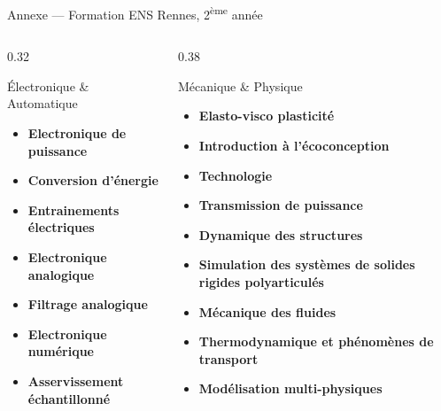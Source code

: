 \documentclass[aspectratio=169]{beamer}
\begin{document}
	\begin{frame}[t,shrink=8]{Annexe — Formation ENS Rennes, 2\textsuperscript{ème} année }
		\begin{columns}[T]
			\begin{column}{0.32\textwidth}
				\begin{block}{Électronique \& Automatique}
					\tiny\begin{itemize}\setlength\itemsep{1pt}\setlength\parsep{0pt}
						\item \textbf{Electronique de puissance}
						\item \textbf{Conversion d'énergie}
						\item \textbf{Entrainements électriques}
						\item \textbf{Electronique analogique}
						\item \textbf{Filtrage analogique}
						\item \textbf{Electronique numérique}
						\item \textbf{Asservissement échantillonné}
					\end{itemize}
				\end{block}
			\end{column}
			\begin{column}{0.38\textwidth}
				\begin{block}{Mécanique \& Physique}
					\tiny\begin{itemize}\setlength\itemsep{1pt}\setlength\parsep{0pt}
						\item \textbf{Elasto-visco plasticité}
						\item \textbf{Introduction à l'écoconception}
						\item \textbf{Technologie}
						\item \textbf{Transmission de puissance}
						\item \textbf{Dynamique des structures}
						\item \textbf{Simulation des systèmes de solides rigides polyarticulés}
						\item \textbf{Mécanique des fluides}
						\item \textbf{Thermodynamique et phénomènes de transport}
						\item \textbf{Modélisation multi-physiques}
					\end{itemize}
				\end{block}

\end{column}
\end{columns}
\end{frame}
\end{document}
